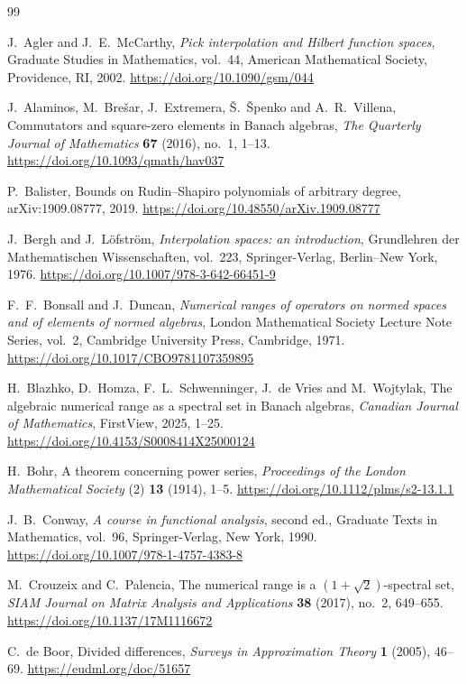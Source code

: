 \documentclass[a4paper]{amsart}
\theoremstyle{remark}
\begin{document}
\begin{thebibliography}{99}

J.~Agler and J.~E.~McCarthy,
\emph{Pick interpolation and Hilbert function spaces},
Graduate Studies in Mathematics, vol.~44, American Mathematical Society, Providence, RI, 2002.
\url{https://doi.org/10.1090/gsm/044}

J.~Alaminos, M.~Bre\v{s}ar, J.~Extremera, \v{S}.~\v{S}penko and A.~R.~Villena,
Commutators and square-zero elements in Banach algebras,
\emph{The Quarterly Journal of Mathematics} \textbf{67} (2016), no.~1, 1--13.
\url{https://doi.org/10.1093/qmath/hav037}

P.~Balister,
Bounds on Rudin--Shapiro polynomials of arbitrary degree,
arXiv:1909.08777, 2019.
\url{https://doi.org/10.48550/arXiv.1909.08777}

J.~Bergh and J.~L\"ofstr\"om,
\emph{Interpolation spaces: an introduction},
Grundlehren der Mathematischen Wissenschaften, vol.~223,
Springer-Verlag, Berlin--New York, 1976.
\url{https://doi.org/10.1007/978-3-642-66451-9}

F.~F.~Bonsall and J.~Duncan,
\emph{Numerical ranges of operators on normed spaces and of elements of normed algebras},
London Mathematical Society Lecture Note Series, vol.~2,
Cambridge University Press, Cambridge, 1971.
\url{https://doi.org/10.1017/CBO9781107359895}

H.~Blazhko, D.~Homza, F.~L.~Schwenninger, J.~de Vries and M.~Wojtylak,
The algebraic numerical range as a spectral set in Banach algebras,
\emph{Canadian Journal of Mathematics}, FirstView, 2025, 1--25.
\url{https://doi.org/10.4153/S0008414X25000124}

H.~Bohr,
A theorem concerning power series,
\emph{Proceedings of the London Mathematical Society} (2) \textbf{13} (1914), 1--5.
\url{https://doi.org/10.1112/plms/s2-13.1.1}

J.~B.~Conway,
\emph{A course in functional analysis}, second ed.,
Graduate Texts in Mathematics, vol.~96,
Springer-Verlag, New York, 1990.
\url{https://doi.org/10.1007/978-1-4757-4383-8}

M.~Crouzeix and C.~Palencia,
The numerical range is a \((1+\sqrt2)\)-spectral set,
\emph{SIAM Journal on Matrix Analysis and Applications} \textbf{38} (2017), no.~2, 649--655.
\url{https://doi.org/10.1137/17M1116672}

C.~de Boor,
Divided differences,
\emph{Surveys in Approximation Theory} \textbf{1} (2005), 46--69.
\url{https://eudml.org/doc/51657}


\end{thebibliography}
\end{document}
